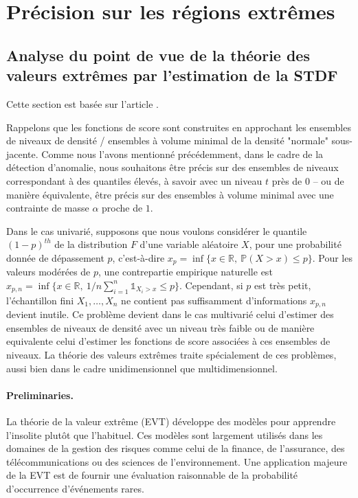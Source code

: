 \documentclass[a4paper, 12pt]{article}
\begin{document}
\section{Précision sur les régions extrêmes}
\label{resume_fr:extreme}
\subsection{Analyse du point de vue de la théorie des valeurs extrêmes par l'estimation de la STDF}
\label{resume_fr:stdf}
Cette section est basée sur l'article \cite{COLT15}.

Rappelons que les fonctions de score sont construites en approchant les ensembles de niveaux de densité / ensembles à volume minimal de la densité "normale" sous-jacente. Comme nous l'avons mentionné précédemment, dans le cadre de la détection d'anomalie, nous souhaitons être précis sur des ensembles de niveaux correspondant à des quantiles élevés, à savoir avec un niveau $ t $ près de $ 0 $ -- ou de manière équivalente, être précis sur des ensembles à volume minimal avec une contrainte de masse $ \alpha $ proche de $ 1 $.

%
Dans le cas univarié, supposons que nous voulons considérer le quantile $ (1-p) ^ {th} $ de la distribution $ F $ d'une variable aléatoire $ X $, pour une probabilité donnée de dépassement $ p $, c'est-à-dire
 $x_p = \inf\{x \in \mathbb{R},~ \mathbb{P}(X > x) \le p\}$. 
Pour les valeurs modérées de $ p $, une contrepartie empirique naturelle est
 $x_{p,n} = \inf\{x \in \mathbb{R},~ 1/n \sum_{i=1}^n \mathds{1}_{X_i > x}\le p\}$.
Cependant, si $ p $ est très petit, l'échantillon fini $ X_1, \ldots, X_n $ ne contient pas suffisamment d'informations $ x_ {p, n} $ devient inutile.
%
Ce problème devient dans le cas multivarié celui d'estimer des ensembles de niveaux de densité avec un niveau très faible ou de manière equivalente celui d'estimer les fonctions de score associées à ces ensembles de niveaux.
%
La théorie des valeurs extrêmes traite spécialement de ces problèmes, aussi bien dans le cadre unidimensionnel que multidimensionnel.
%


\paragraph{Preliminaries.}
La théorie de la valeur extrême (\textsc {EVT}) développe des modèles pour apprendre l'insolite plutôt que l'habituel. Ces modèles sont largement utilisés dans les domaines de la gestion des risques comme celui de la finance, de l'assurance, des télécommunications ou des sciences de l'environnement. Une application majeure de la \textsc{EVT} est de fournir une évaluation raisonnable de la probabilité d'occurrence d'événements rares.
\end{document}
